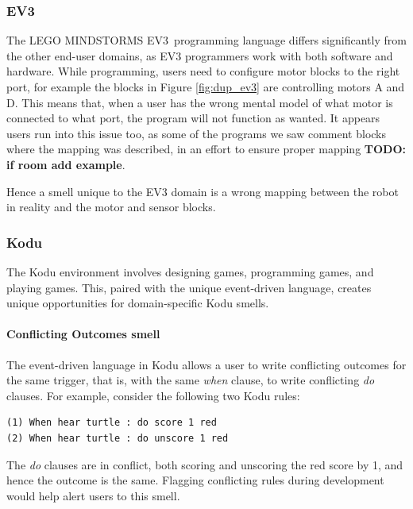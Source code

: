\documentclass{sig-alternate}
\newcommand{\todo}[1]{\textbf{TODO: #1}}
\newcommand{\ms}{LEGO MINDSTORMS EV3}
\begin{document}
\subsubsection{EV3}
The \ms~programming language differs significantly from the other end-user domains, as EV3 programmers work with both software and hardware. While programming, users need to configure motor blocks to the right port, for example the blocks in Figure \ref{fig:dup_ev3} are controlling motors A and D. This means that, when a user has the wrong mental model of what motor is connected to what port, the program will not function as wanted. It appears users run into this issue too, as some of the programs we saw comment blocks where the mapping was described, in an effort to ensure proper mapping \todo{if room add example}.

Hence a smell unique to the EV3 domain is a wrong mapping between the robot in reality and the motor and sensor blocks. 







\subsubsection{Kodu}
The Kodu environment involves designing games, programming games, and playing games. This, paired with the unique event-driven language, creates unique opportunities for domain-specific Kodu smells. 

% 


\paragraph{Conflicting Outcomes smell}
The event-driven language in Kodu allows a user to write conflicting outcomes for the same trigger, that is, with the same \emph{when} clause, to write conflicting \emph{do} clauses. For example, consider the following two Kodu rules:
\begin{verbatim}
(1) When hear turtle : do score 1 red
(2) When hear turtle : do unscore 1 red
\end{verbatim}
\noindent The \emph{do} clauses are in conflict, both scoring and unscoring the red score by 1, and hence the outcome is the same. Flagging conflicting rules during development would help alert users to this smell. 
\end{document}
